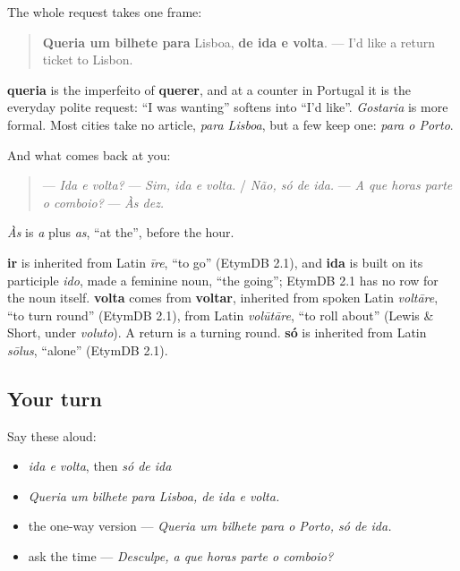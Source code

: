\begin{grammarlens}[title={Grammar Lens: queria um bilhete para…}]
The whole request takes one frame:

\begin{quote}
\textbf{Queria um bilhete para} Lisboa, \textbf{de ida e volta}. — I'd like a return ticket to Lisbon.
\end{quote}

\textbf{queria} is the imperfeito of \textbf{querer}, and at a counter in Portugal it is the everyday polite request: \textquotedblleft{}I was wanting\textquotedblright{} softens into \textquotedblleft{}I'd like\textquotedblright{}. \emph{Gostaria} is more formal. Most cities take no article, \emph{para Lisboa}, but a few keep one: \emph{para o Porto}.

And what comes back at you:

\begin{quote}
— \emph{Ida e volta?} — \emph{Sim, ida e volta.} / \emph{Não, só de ida.} — \emph{A que horas parte o comboio?} — \emph{Às dez.}
\end{quote}

\emph{Às} is \emph{a} plus \emph{as}, \textquotedblleft{}at the\textquotedblright{}, before the hour.
\end{grammarlens}

\begin{cousinweb}
\textbf{ir} is inherited from Latin \emph{īre}, \textquotedblleft{}to go\textquotedblright{} (EtymDB 2.1), and \textbf{ida} is built on its participle \emph{ido}, made a feminine noun, \textquotedblleft{}the going\textquotedblright{}; EtymDB 2.1 has no row for the noun itself. \textbf{volta} comes from \textbf{voltar}, inherited from spoken Latin \emph{voltāre}, \textquotedblleft{}to turn round\textquotedblright{} (EtymDB 2.1), from Latin \emph{volūtāre}, \textquotedblleft{}to roll about\textquotedblright{} (Lewis \& Short, under \emph{voluto}). A return is a turning round. \textbf{só} is inherited from Latin \emph{sōlus}, \textquotedblleft{}alone\textquotedblright{} (EtymDB 2.1).
\end{cousinweb}

\subsection*{Your turn}
Say these aloud:

\begin{itemize}
\raggedright
  \item \emph{ida e volta}, then \emph{só de ida}
  \item \emph{Queria um bilhete para Lisboa, de ida e volta.}
  \item the one-way version — \emph{Queria um bilhete para o Porto, só de ida.}
  \item ask the time — \emph{Desculpe, a que horas parte o comboio?}
\end{itemize}

